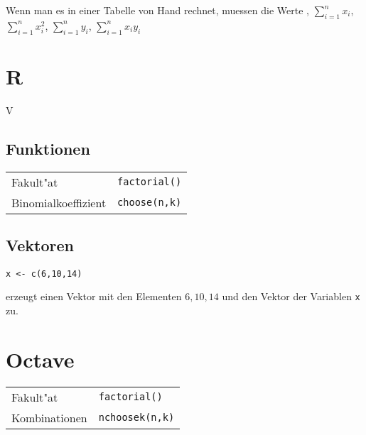 \documentclass[ngerman, a4paper, 10pt, twocolumn, DIV20, headings=small]{scrartcl}
\begin{document}
Wenn man es in einer Tabelle von Hand rechnet, muessen die Werte , $\sum_{i=1}^nx_i$, $\sum_{i=1}^nx_i^2$, $\sum_{i=1}^ny_i$, $\sum_{i=1}^nx_iy_i$
\section{R}
\label{sec:r}

V

\subsection{Funktionen}
\label{sec:r-funktionen}

\begin{tabular}{l l}
  Fakult"at & \verb|factorial()| \\
  Binomialkoeffizient & \verb|choose(n,k)| \\
\end{tabular}

\subsection{Vektoren}
\label{sec:r-vektoren}

\begin{verbatim}
x <- c(6,10,14)
\end{verbatim}
erzeugt einen Vektor mit den Elementen $6, 10, 14$ und den Vektor der Variablen \verb|x| zu.

\section{Octave}
\label{sec:octave}

\begin{tabular}{l l}
  Fakult"at & \verb|factorial()| \\
  Kombinationen & \verb|nchoosek(n,k)| \\
\end{tabular}
\end{document}
